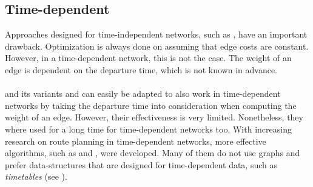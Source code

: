\subsection{Time-dependent}
	Approaches designed for time-independent networks, such as \alt, have an important drawback. Optimization is always done on
	assuming that edge costs are constant. However, in a time-dependent network, this is not the case. The weight of an edge is
	dependent on the departure time, which is not known in advance.\\\\
	\dijkstra and its variants \astar and \alt can easily be adapted to also work in time-dependent networks by taking the departure
	time into consideration when computing the weight of an edge. However, their effectiveness is very limited.
	Nonetheless, they where used for a long time for time-dependent networks too. With increasing research on route
	planning in time-dependent networks, more effective algorithms, such as \transferPatterns {}
	and \csa {}, were developed. Many of them do not use graphs and prefer data-structures that are designed
	for time-dependent data, such as \textit{timetables} (see ).

